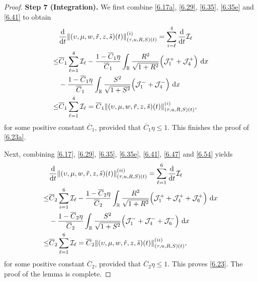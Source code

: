 \documentclass[11pt,reqno]{article}
\newcommand{\fr}{\frac}
\numberwithin{equation}{section}
\begin{document}
\begin{proof}
\textbf{Step 7 (Integration).}
We first combine \eqref{6.17a}, \eqref{6.29}, \eqref{6.35}, \eqref{6.35e} and \eqref{6.41} to obtain
\begin{align}\label{6.55a}
\begin{split}
&\fr{{\rm d}}{{\rm d}t}\|(\upsilon, \mu, w, \tilde{r}, z, \tilde{s})(t)\|_{(\tau, u, R, S)(t)}^{(i)} =\sum_{i=\ell}^4\fr{{\rm d}}{{\rm d}t}\mathcal{I}_\ell \\
\leq & \overline{C}_1\sum_{\ell=1}^4\mathcal{I}_\ell -\fr{1-\overline{C}_1\eta}{\overline{C}_1}\int_{\mathbb{R}}\fr{R^2}{\sqrt{1+R^2}} \Big(\mathcal{J}_{1}^+  +\mathcal{J}_{4}^+ \Big)\ {\rm d}x \\ &-\fr{1-\overline{C}_1\eta}{\overline{C}_1}\int_{\mathbb{R}}\fr{S^2}{\sqrt{1+S^2}} \Big(\mathcal{J}_{1}^-  +\mathcal{J}_{4}^- \Big)\ {\rm d}x \\
\leq &\overline{C}_1\sum_{\ell=1}^4\mathcal{I}_\ell =\overline{C}_1\|(\upsilon, \mu, w, \tilde{r}, z, \tilde{s})(t)\|_{(\tau, u, R, S)(t)}^{(i)},
\end{split}
\end{align}
for some positive constant $\overline{C}_1$, provided that $\overline{C}_1\eta\leq 1$. This finishes the proof of \eqref{6.23a}.

Next, combining \eqref{6.17}, \eqref{6.29}, \eqref{6.35}, \eqref{6.35e}, \eqref{6.41}, \eqref{6.47} and \eqref{6.54} yields
\begin{align}\label{6.55}
\begin{split}
&\fr{{\rm d}}{{\rm d}t}\|(\upsilon, \mu, w, \tilde{r}, z, \tilde{s})(t)\|_{(\tau, u, R, S)(t)}^{(ii)} =\sum_{\ell=1}^6\fr{{\rm d}}{{\rm d}t}\mathcal{I}_\ell \\
\leq & \overline{C}_2\sum_{i=1}^6\mathcal{I}_\ell -\fr{1-\overline{C}_2\eta}{\overline{C}_2}\int_{\mathbb{R}}\fr{R^2}{\sqrt{1+R^2}} \Big(\mathcal{J}_{1}^+ +\mathcal{J}_{4}^+ +\mathcal{J}_{6}^+\Big)\ {\rm d}x \\ &-\fr{1-\overline{C}_2\eta}{\overline{C}_2}\int_{\mathbb{R}}\fr{S^2}{\sqrt{1+S^2}} \Big(\mathcal{J}_{1}^- +\mathcal{J}_{4}^- +\mathcal{J}_{6}^-\Big)\ {\rm d}x \\
\leq &\overline{C}_2\sum_{\ell=1}^6\mathcal{I}_\ell =\overline{C}_2\|(\upsilon, \mu, w, \tilde{r}, z, \tilde{s})(t)\|_{(\tau, u, R, S)(t)}^{(ii)},
\end{split}
\end{align}
for some positive constant $\overline{C}_2$, provided that $\overline{C}_2\eta\leq 1$. This proves \eqref{6.23}. The proof of the lemma is complete.
\end{proof}
\end{document}
